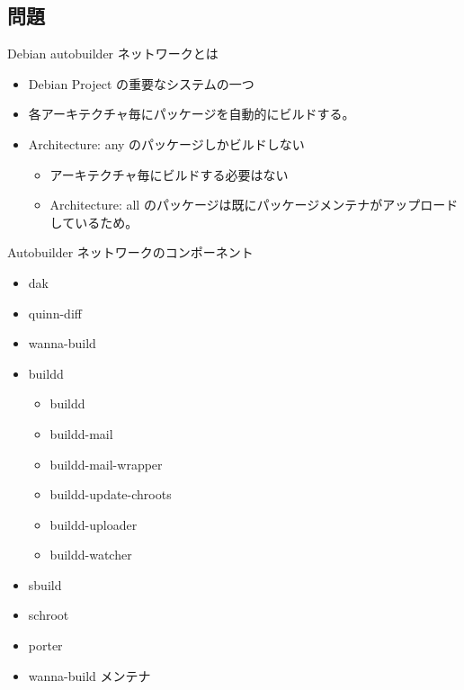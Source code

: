 \subsection{問題}





\begin{frame}{Debian autobuilder ネットワークとは}
\begin{itemize}
\item Debian Project の重要なシステムの一つ
\item 各アーキテクチャ毎にパッケージを自動的にビルドする。
\item Architecture: any のパッケージしかビルドしない
\begin{itemize}
\item アーキテクチャ毎にビルドする必要はない
\item Architecture: all のパッケージは既にパッケージメンテナがアップロードしているため。
\end{itemize}
\end{itemize}
\end{frame}

\begin{frame}{Autobuilder ネットワークのコンポーネント}
\begin{itemize}
\item dak
\item quinn-diff
\item wanna-build
\item buildd
 
\begin{itemize}
\item buildd
\item buildd-mail
\item buildd-mail-wrapper
\item buildd-update-chroots
\item buildd-uploader
\item buildd-watcher
\end{itemize}

\item sbuild
\item schroot
\item porter
\item wanna-build メンテナ
\end{itemize}

\end{frame}

